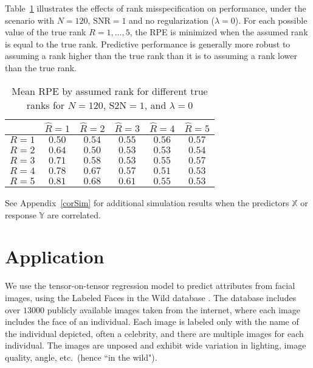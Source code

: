 \documentclass[12pt]{article}
\def\XX{\mathbb{X}}
\def\YY{\mathbb{Y}}
\begin{document}
Table~\ref{tab:ranks} illustrates the effects of rank misspecification on performance, under the scenario with $N=120$, SNR$=1$ and no regularization ($\lambda=0$).  For each possible value of the true rank $R=1,\hdots,5$, the RPE is minimized when the assumed rank is equal to the true rank.  Predictive performance is generally more robust to assuming a rank higher than the true rank than it is to assuming a rank lower than the true rank.  

\begin{table}[H]
\caption{\label{tab:ranks} Mean RPE by assumed rank for different true ranks for $N=120$, S2N$=1$, and $\lambda=0$}
\centering
\begin{tabular}{l|c c c c c}
\hline 
 & $\hat{R}=1$ & $\hat{R}=2$ & $\hat{R}=3$ & $\hat{R}=4$ & $\hat{R}=5$ \\
\hline 
$R=1$ & $\mathbf{0.50}$ & $0.54$ & $0.55$ & $0.56$ & $0.57$\\
$R=2$ & $0.64$ & $\mathbf{0.50}$ & $0.53$ & $0.53$ & $0.54$ \\
$R=3$ &  $0.71$ & $0.58$ & $\mathbf{0.53}$ & $0.55$ &  $0.57$ \\
$R=4$ & $0.78$ & $0.67$ &  $0.57$ &  $\mathbf{0.51}$ & $0.53$\\
$R=5$ & $0.81$ & $0.68$ &  $0.61$ &  $0.55$ & $\mathbf{0.53}$\\
\end{tabular}
\end{table}

See Appendix~\ref{corSim} for additional simulation results when the predictors $\XX$ or response $\YY$ are correlated.  


\section{Application}
\label{app}
We use the tensor-on-tensor regression model to predict attributes from facial images, using the Labeled Faces in the Wild database \citep{learned2016labeled}. The database includes over $13000$ publicly available images taken from the internet, where each image includes the face of an individual.  Each image is labeled only with the name of the individual depicted, often a celebrity, and there are multiple images for each individual. The images are unposed and exhibit wide variation in lighting, image quality, angle, etc.\ (hence ``in the wild").
\end{document}
